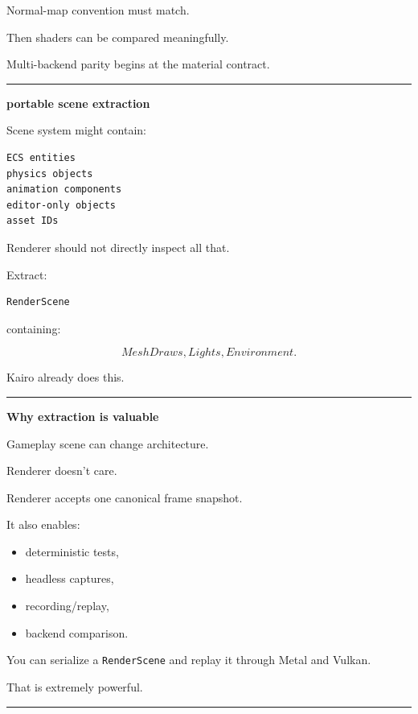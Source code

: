 Normal-map convention must match.

Then shaders can be compared meaningfully.

Multi-backend parity begins at the material contract.

\begin{center}\rule{0.5\linewidth}{0.5pt}\end{center}

\textbf{portable scene extraction}

Scene system might contain:

\begin{verbatim}
ECS entities
physics objects
animation components
editor-only objects
asset IDs
\end{verbatim}

Renderer should not directly inspect all that.

Extract:

\begin{verbatim}
RenderScene
\end{verbatim}

containing:

\[
MeshDraws,
Lights,
Environment.
\]

Kairo already does this.

\begin{center}\rule{0.5\linewidth}{0.5pt}\end{center}

\textbf{Why extraction is valuable}

Gameplay scene can change architecture.

Renderer doesn't care.

Renderer accepts one canonical frame snapshot.

It also enables:

\begin{itemize}
\tightlist
\item
  deterministic tests,
\item
  headless captures,
\item
  recording/replay,
\item
  backend comparison.
\end{itemize}

You can serialize a \texttt{RenderScene} and replay it through Metal and Vulkan.

That is extremely powerful.

\begin{center}\rule{0.5\linewidth}{0.5pt}\end{center}

